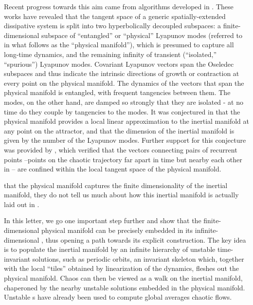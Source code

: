 \documentclass[prl,aps,preprint,showpacs,superscriptaddress]{revtex4-1} %
\begin{document}
Recent progress towards this aim came from 
algorithms developed in .
These works have revealed that the tangent space
of a generic spatially-extended dissipative system is split into two
hyperbolically decoupled subspaces: a finite-dimensional subspace of
``entangled'' or ``physical'' Lyapunov modes (referred to in what follows
as the ``physical manifold''), which is presumed to capture all long-time
dynamics, and the remaining infinity of transient (``isolated,''
``spurious'') Lyapunov modes.
Covariant Lyapunov vectors span the Oseledec
subspaces and thus indicate the intrinsic
directions of growth or contraction at every point on the
physical manifold.
The dynamics of the vectors that span the physical manifold is entangled,
with frequent tangencies between them.
The {\transient} modes, on the other hand, are damped so strongly
that they are isolated - at no time do they couple by
tangencies to the {\entangled} modes.
It was conjectured in  that the physical
manifold provides a local linear approximation to the inertial manifold
at any point on the attractor, and that the dimension of the inertial
manifold is given by the number of the {\entangled} Lyapunov modes. Further
support for this conjecture was provided by
, which verified that the vectors connecting pairs of
recurrent points --points on the chaotic trajectory far apart in time but
nearby each other in \statesp-- are confined within the local tangent
space of the physical manifold.

 that the physical manifold captures the
finite dimensionality of the inertial manifold, they do not tell us
much about how this inertial manifold is actually laid out in \statesp.

In this letter, we go one important step further and show that the
finite-dimensional physical manifold can be precisely embedded in its
infinite-dimensional \statesp, thus opening a path towards its explicit
construction. The key idea is to populate the inertial
manifold by an infinite hierarchy of unstable time-invariant solutions,
such as periodic orbits, an invariant skeleton which, together
with the local ``tiles'' obtained by linearization of the dynamics,
fleshes out the physical manifold. Chaos can then be viewed as a walk on
the inertial manifold, chaperoned by the nearby unstable solutions
embedded in the physical manifold.
Unstable \po s have already been
used to compute global averages  chaotic flows.
\end{document}
